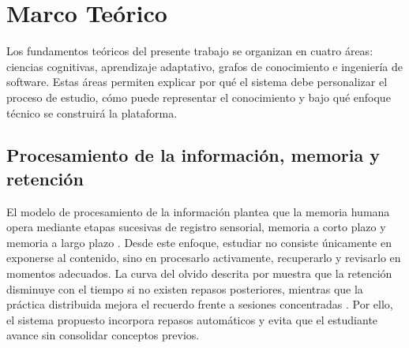 \documentclass{univalle-perfil}
\begin{document}
\section{Marco Teórico}

Los fundamentos teóricos del presente trabajo se organizan en cuatro áreas: ciencias cognitivas, aprendizaje adaptativo, grafos de conocimiento e ingeniería de software. Estas áreas permiten explicar por qué el sistema debe personalizar el proceso de estudio, cómo puede representar el conocimiento y bajo qué enfoque técnico se construirá la plataforma.

\subsection{Procesamiento de la información, memoria y retención}

El modelo de procesamiento de la información plantea que la memoria humana opera mediante etapas sucesivas de registro sensorial, memoria a corto plazo y memoria a largo plazo \parencite{atkinson1968}. Desde este enfoque, estudiar no consiste únicamente en exponerse al contenido, sino en procesarlo activamente, recuperarlo y revisarlo en momentos adecuados. La curva del olvido descrita por \textcite{ebbinghaus1913} muestra que la retención disminuye con el tiempo si no existen repasos posteriores, mientras que la práctica distribuida mejora el recuerdo frente a sesiones concentradas \parencite{cepeda2006}. Por ello, el sistema propuesto incorpora repasos automáticos y evita que el estudiante avance sin consolidar conceptos previos.
\end{document}
